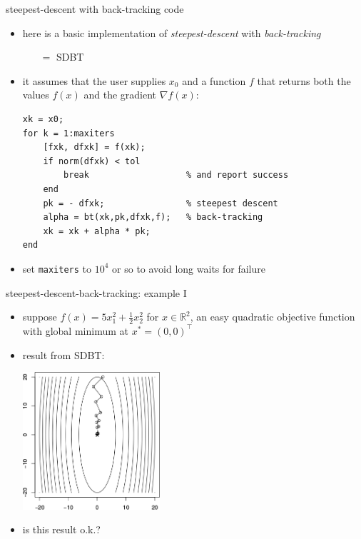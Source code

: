 \documentclass[10pt,hyperref]{beamer}
\newcommand{\grad}{\nabla}
\newcommand{\RR}{\mathbb{R}}
\begin{document}
\begin{frame}[fragile]{steepest-descent with back-tracking code}

\begin{itemize}
\item here is a basic implementation of \emph{steepest-descent} with \emph{back-tracking}
    \begin{itemize}
    \item[$=$] SDBT
    \end{itemize}
\item it assumes that the user supplies $x_0$ and a function $f$ that returns both the values $f(x)$ and the gradient $\grad f(x)$:

\medskip
\begin{Verbatim}[fontsize=\small]
xk = x0;
for k = 1:maxiters
    [fxk, dfxk] = f(xk);
    if norm(dfxk) < tol
        break                   % and report success
    end
    pk = - dfxk;                % steepest descent
    alpha = bt(xk,pk,dfxk,f);   % back-tracking
    xk = xk + alpha * pk;
end
\end{Verbatim}

\medskip
\item set \texttt{maxiters} to $10^4$ or so to avoid long waits for failure
\end{itemize}
\end{frame}


\begin{frame}{steepest-descent-back-tracking: example I}

\begin{itemize}
\item suppose $f(x) = 5 x_1^2 + \frac{1}{2} x_2^2$ for $x\in\RR^2$, an easy quadratic objective function with global minimum at $x^*=(0,0)^\top$
\item result from SDBT:

\begin{center}
\includegraphics[width=0.4\textwidth]{egg-sd-backtracking}
\end{center}

\medskip
\item is this result o.k.?
\end{itemize}
\end{frame}
\end{document}
